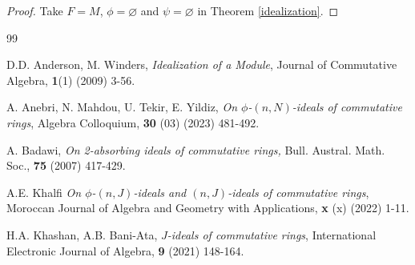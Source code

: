 \documentclass[preprint,review,10pt]{amsart}
\theoremstyle{definition}
\newtheorem{example}[theorem]{Example}
\theoremstyle{remark}
\numberwithin{equation}{section}
\begin{document}
 \begin{proof}
 Take  $F=M$, $\phi=\varnothing$ and  $\psi=\varnothing$  in Theorem \ref{idealization}.
 \end{proof}
  



\begin{thebibliography}{99}

D.D. Anderson, M.   Winders, {\it Idealization of a Module}, Journal of Commutative Algebra, {\bf 1}(1) (2009) 3-56.

A. Anebri, N. Mahdou, U. Tekir, E. Yildiz, {\it On $\phi$-$(n,N)$-ideals of commutative rings}, Algebra Colloquium, {\bf 30} (03) (2023) 481-492.





A. Badawi, {\it On 2-absorbing ideals of commutative rings,} Bull. Austral. Math. Soc., {\bf 75} (2007) 417-429.


A.E.  Khalfi {\it On $\phi$-$(n,J)$-ideals and $(n,J)$-ideals of commutative rings}, Moroccan Journal of Algebra and Geometry with Applications, {\bf x} (x) (2022) 1-11.



H.A. Khashan, A.B. Bani-Ata, {\it $J$-ideals of commutative rings}, International Electronic Journal of Algebra, {\bf 9} (2021) 148-164.



\end{thebibliography}
\end{document}
